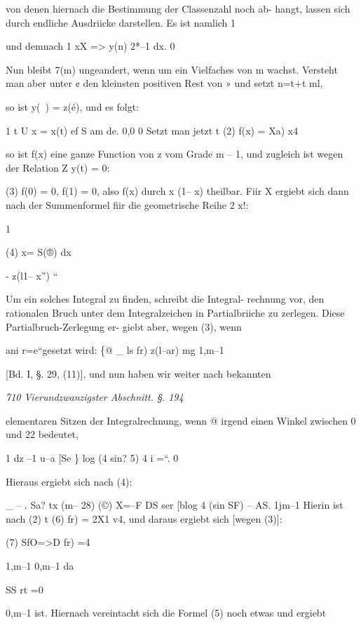 \documentclass[12pt,a4paper]{article}
\theoremstyle{plain}
\theoremstyle{definition}
\begin{document}

von denen hiernach die Bestimmung der Classenzahl noch ab- hangt, lassen sich durch endliche Ausdriicke darstellen. Es ist namlich 1

und demnach 1 xX => y(n) 2*--1 dx. 0

Nun bleibt 7(m) ungeandert, wenn um ein Vielfaches von m wachst. Versteht man aber unter ¢ den kleinsten positiven Rest von » und setzt n=t+t ml,

so ist y(~) = z(é), und es folgt:

1 t U x = x(t) ef S am de. 0,0 0 Setzt man jetzt t (2) f(x) = Xa) x4

so ist f(x) eine ganze Function von z vom Grade m -- 1, und zugleich ist wegen der Relation Z y(t) = 0:

(3) f(0) = 0, f(1) = 0, also f(x) durch x (1-- x) theilbar. Fiir X ergiebt sich dann nach der Summenformel fiir die geometrische Reihe 2 x\texttrademark !:

1

(4) x= S(®) dx

- z(l1-- x'') ``

Um ein solches Integral zu finden, schreibt die Integral- rechnung vor, den rationalen Bruch unter dem Integralzeichen in Partialbriiche zu zerlegen. Diese Partialbruch-Zerlegung er- giebt aber, wegen (3), wenn

ani r=e``\texttrademark  gesetzt wird: \{@  \_ ls fr) z(l--ar\texttrademark ) mg 1,m--1

[Bd. I, §. 29, (11)], und nun haben wir weiter nach bekannten

\vspace{0.5\baselineskip}\noindent\textit{710 Vierundzwanzigster Abschnitt. §. 194}\par

elementaren Sitzen der Integralrechnung, wenn @ irgend einen Winkel zwischen 0 und 22 bedeutet,

1 dz --1 u--a [Se \} log (4 sin? 5) 4 i =``. 0

Hieraus ergiebt sich nach (4):

\_ -- . Sa? tx (m-- 28) (©) X=--F DS ser [blog 4 (sin SF) -- AS. 1jm--1 Hierin ist nach (2) t (6) fr) = 2X1 v4, und daraus ergiebt sich [wegen (3)]:

(7) SfO=>D fr) =4

1,m--1 0,m--1 da

SS rt =0

0,m--1 ist. Hiernach vereintacht sich die Formel (5) noch etwas und ergiebt
\end{document}

